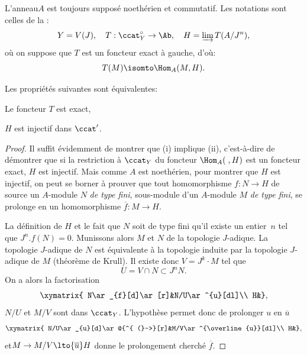 L'anneau\pageoriginale $A$ est toujours suppos\'e noeth\'erien et commutatif. Les notations sont celles de la :
\begin{equation*} Y=V(J), \quad T:\ccat_{Y}^{\circ}\to \Ab, \quad H=\varinjlim T(A/J^{n}),
\end{equation*}
o\`u on suppose que $T$ est un foncteur exact \`a gauche, d'o\`u:
\begin{equation*} T(M)\isomto \Hom_{A}(M, H).
\end{equation*}

\begin{proposition} \label{IV.2.1}
Les propri\'et\'es suivantes sont \'equivalentes:
\begin{enumeratei}
\item
Le foncteur $T$ est exact,

\item
$H$ est injectif dans $\ccat'$.
\end{enumeratei}
\end{proposition}

\begin{proof}
Il suffit \'evidemment de montrer que (i) implique (ii), c'est-\`a-dire de d\'emontrer que si la restriction \`a $\ccat_{Y}$ du foncteur $\Hom_{A}(\;, H)$ est un foncteur exact, $H$ est injectif. Mais comme $A$ est noeth\'erien, pour montrer que $H$ est injectif, on peut se borner \`a prouver que tout homomorphisme $f:N\to H$ de source un $A$-module $N$ \emph{de type fini}, sous-module d'un $A$-module $M$ \emph{de type fini}, se prolonge en un homomorphisme $\overline{f}:M\to H$.

La d\'efinition de $H$ et le fait que $N$ soit de type fini  qu'il existe un entier~$n$ tel que $J^{n}.f(N)=0$. Munissons alors $M$ et $N$ de la topologie $J$-adique. La topologie $J$-adique de $N$ est \'equivalente \`a la topologie induite par la topologie $J$-adique de $M$ (th\'eor\`eme de Krull). Il existe donc $V=J^{k}\cdot M$ tel que
\begin{equation*} U=V\cap N\subset J^{n}N.
\end{equation*}
On a alors la factorisation
$$
\xymatrix{ N\ar_{f}[d]\ar[r]&N/U\ar^{u}[dl]\\
H&},
$$
$N/U$ et $M/V$ sont dans $\ccat_{Y}$. L'hypoth\`ese permet donc de prolonger $u$ en $\overline{u}$
$$
\xymatrix{ N/U\ar_{u}[d]\ar@{^{ (}->}[r]&M/V\ar^{\overline{u}}[dl]\\
H&},
$$
et\pageoriginale $M\to M/V\lto{\overline{u}} H$ donne le prolongement cherch\'e $\overline{f}$.
\skipqed
\end{proof}

